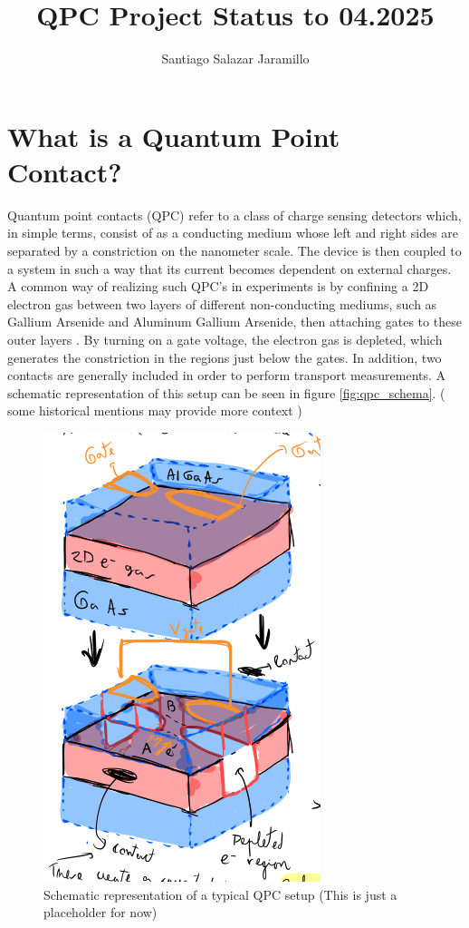 \documentclass{article}
\title{QPC Project Status to 04.2025}
\author{Santiago Salazar Jaramillo}
\date{}
\newcommand\sj[1]{ {\color{orange} #1} }
\begin{document}
\maketitle

\section{What is a Quantum Point Contact?}

Quantum point contacts (QPC) refer to a class of charge sensing detectors which, in simple terms, consist of 
as a conducting medium whose left and right sides are separated by a constriction 
on the nanometer scale. The device is then coupled to a system in such a way that its current becomes dependent on
 external charges. A common way of realizing such QPC's in experiments is by confining a 2D electron gas 
between two layers of different non-conducting mediums, such as Gallium Arsenide and Aluminum Gallium Arsenide,
then attaching gates to these outer layers \cite{vanhoutenQuantumPointContacts1996}. By turning on a gate voltage, 
the electron gas is depleted, which generates the constriction in the regions just below the gates. In addition, two 
contacts are generally included in order to perform transport measurements. A schematic representation of this setup can 
be seen in figure \ref{fig:qpc_schema}. (\sj{some historical mentions may provide more context})

\begin{figure}[h!]
    \centering
        \includegraphics[width=0.3\linewidth]{figures/report_04_2025/qpc_schema.png}
        \caption{Schematic representation of a typical QPC setup \sj{(This is just a placeholder for now)}}
\end{figure}\label{fig:qpc_schema}
\end{document}

